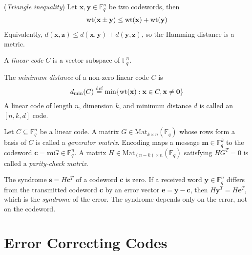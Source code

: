 \documentclass[a4paper, 12pt]{book} %
\begin{document}
\begin{proposition}
    (\emph{Triangle inequality}) Let $\mathbf{x}, \mathbf{y} \in \mathbb{F}_q^n$ be two codewords, then
    \begin{align}
        \mathrm{wt}(\mathbf{x} \pm \mathbf{y}) \leq \mathrm{wt}(\mathbf{x}) + \mathrm{wt}(\mathbf{y})
    \end{align}
    Equivalently, $d(\mathbf{x}, \mathbf{z}) \leq d(\mathbf{x}, \mathbf{y}) + d(\mathbf{y}, \mathbf{z})$, so the Hamming distance is a metric.
\end{proposition}

\begin{definition}
    A \emph{linear code} $C$ is a vector subspace of $\mathbb{F}_q^n$.
\end{definition}

\begin{definition}
    The \emph{minimum distance} of a non-zero linear code $C$ is
    \begin{align}
        d_{\min}(C) \overset{\text{def}}{=} \min \{ \mathrm{wt}(\mathbf{x}) : \mathbf{x} \in C, \mathbf{x} \neq \mathbf{0} \}
    \end{align}
    A linear code of length $n$, dimension $k$, and minimum distance $d$ is called an $[n, k, d]$ code.
\end{definition}

\begin{definition}
    Let $C \subseteq \mathbb{F}_q^n$ be a linear code. A matrix $G \in \mathrm{Mat}_{k \times n}(\mathbb{F}_q)$ whose rows form a basis of $C$ is called a \emph{generator matrix}. Encoding maps a message $\mathbf{m} \in \mathbb{F}_q^k$ to the codeword $\mathbf{c} = \mathbf{m} G \in \mathbb{F}_q^n$. A matrix $H \in \mathrm{Mat}_{(n-k) \times n}(\mathbb{F}_q)$ satisfying $H G^T = 0$ is called a \emph{parity-check matrix}.
\end{definition}

\begin{proposition}
    The syndrome $\mathbf{s} = H \mathbf{c}^T$ of a codeword $\mathbf{c}$ is zero. If a received word $\mathbf{y} \in \mathbb{F}_q^n$ differs from the transmitted codeword $\mathbf{c}$ by an error vector $\mathbf{e} = \mathbf{y} - \mathbf{c}$, then $H \mathbf{y}^T = H\mathbf{e}^T$, which is the \emph{syndrome} of the error. The syndrome depends only on the error, not on the codeword.
\end{proposition}

\section{Error Correcting Codes}
\end{document}
